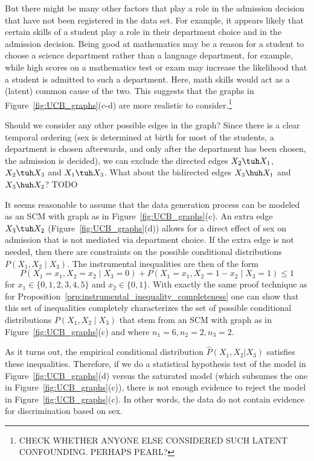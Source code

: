 \begin{Eg}
  But there might be many other factors that play a role in the admission decision that have not been registered in the data set.
  For example, it appears likely that certain skills of a student play a role in their department choice and in the admission decision.
  Being good at mathematics may be a reason for a student to choose a science department rather than a language department, for example,
  while high scores on a mathematics test or exam may increase the likelihood that a student is admitted to such a department.
  Here, math skills would act as a (latent) common cause of the two.
  This suggests that the graphs in Figure~\ref{fig:UCB_graphs}(c-d) are more realistic to consider.\footnote{CHECK WHETHER ANYONE ELSE 
  CONSIDERED SUCH LATENT CONFOUNDING. PERHAPS PEARL?}

  Should we consider any other possible edges in the graph?
  Since there is a clear temporal ordering (sex is determined at birth for most of the students, a department is chosen afterwards, and only after the department has been chosen, the admission is decided), we can exclude the directed edges $X_2 \tuh X_1$, $X_2 \tuh X_3$ and $X_1 \tuh X_3$.
  What about the bidirected edges $X_3 \huh X_1$ and $X_3 \huh X_2$?
  TODO

  It seems reasonable to assume that the data generation process can be modeled as an SCM with graph as in Figure~\ref{fig:UCB_graphs}(c).
  An extra edge $X_3 \tuh X_2$ (Figure~\ref{fig:UCB_graphs}(d)) allows for a direct effect of sex on admission that is not mediated via department choice.
  If the extra edge is not needed, then there are constraints on the possible conditional distributions $P(X_1,X_2 \mid X_3)$.
  The instrumental inequalities are then of the form
  $$P(X_1=x_1,X_2=x_2 \mid X_3=0) + P(X_1=x_1,X_2=1-x_2 \mid X_3=1) \le 1$$
  for $x_1 \in \{0,1,2,3,4,5\}$ and $x_2 \in \{0,1\}$.
  With exactly the same proof technique as for Proposition~\ref{prp:instrumental_inequality_completeness} one can show that this set of
  inequalities completely characterizes the set of possible conditional distributions $P(X_1,X_2 \mid X_3)$ that stem from an SCM with graph
  as in Figure~\ref{fig:UCB_graphs}(c) and where $n_1 = 6, n_2 = 2, n_3 = 2$.

  As it turns out, the empirical conditional distribution $\hat P(X_1,X_2 | X_3)$ satisfies these inequalities.
  Therefore, if we do a statistical hypothesis test of the model in Figure~\ref{fig:UCB_graphs}(d) versus the saturated model (which subsumes the one in Figure~\ref{fig:UCB_graphs}(c)), there is not enough evidence to reject the model in Figure~\ref{fig:UCB_graphs}(c). 
  In other words, the data do not contain evidence for discrimination based on sex.
\end{Eg}


